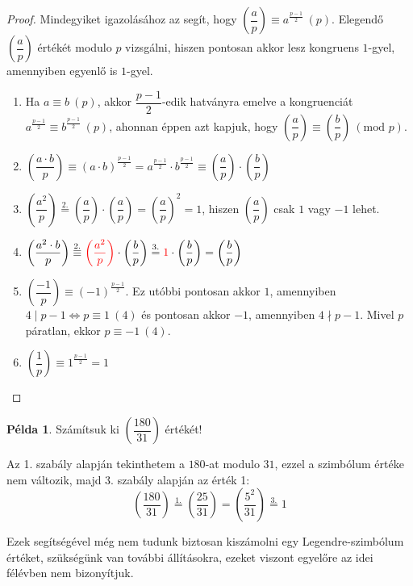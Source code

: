 \documentclass[12pt]{book}
\theoremstyle{plain} %
\theoremstyle{definition} %
\newtheorem{pl}{Példa}[section]
\theoremstyle{remark}
\numberwithin{equation}{section}  %
\begin{document}
	\begin{proof}
		Mindegyiket igazolásához az segít, hogy $\left(\dfrac{a}{p}\right) \equiv a^{\frac{p-1}{2}}\ (p)$. Elegendő $\left(\dfrac{a}{p}\right)$ értékét modulo $p$ vizsgálni, hiszen pontosan akkor lesz kongruens $1$-gyel, amennyiben egyenlő is $1$-gyel.
		\begin{enumerate}
			\item{Ha $a\equiv b\ (p)$, akkor $\dfrac{p-1}{2}$-edik hatványra emelve a kongruenciát $a^{\frac{p-1}{2}} \equiv b^{\frac{p-1}{2}}\ (p)$, ahonnan éppen azt kapjuk, hogy $\left(\dfrac{a}{p}\right) \equiv \left(\dfrac{b}{p}\right)\ (\text{mod } p)$.}
			\item{$\left(\dfrac{a\cdot b}{p}\right) \equiv (a\cdot b)^{\frac{p-1}{2}} = a^{\frac{p-1}{2}} \cdot b^{\frac{p-1}{2}} \equiv \left(\dfrac{a}{p}\right) \cdot \left(\dfrac{b}{p}\right)$}
			\item{$\left(\dfrac{a^2}{p}\right) \stackrel{2.}{=} \left(\dfrac{a}{p}\right)\cdot \left(\dfrac{a}{p}\right) = \left(\dfrac{a}{p}\right)^2 = 1 $, hiszen $\left(\dfrac{a}{p}\right)$ csak $1$ vagy $-1$ lehet.}
			\item{$\left(\dfrac{a^2\cdot b}{p}\right) \stackrel{2.}{\equiv} \color{red} \left(\dfrac{a^2}{p}\right) \color{black} \cdot \left(\dfrac{b}{p}\right) \stackrel{3.}{=} \color{red}1\color{black} \cdot \left(\dfrac{b}{p}\right) = \left(\dfrac{b}{p}\right)$}
			\item{$\left(\dfrac{-1}{p}\right) \equiv (-1)^{\frac{p-1}{2}}$. Ez utóbbi pontosan akkor $1$, amennyiben $4\mid p-1 \Leftrightarrow p \equiv 1\ (4)$ és pontosan akkor $-1$, amennyiben $4\nmid p-1$. Mivel $p$ páratlan, ekkor $p\equiv -1\ (4)$.}
			\item{$\left(\dfrac{1}{p}\right) \equiv 1^{\frac{p-1}{2}} = 1$}
		\end{enumerate}
	\end{proof}

	\begin{pl}
		Számítsuk ki $\left(\dfrac{180}{31}\right)$ értékét!
		
		Az 1. szabály alapján tekinthetem a $180$-at modulo $31$, ezzel a szimbólum értéke nem változik, majd 3. szabály alapján az érték 1:
		\[ \left(\dfrac{180}{31}\right) \stackrel{1.}{=} \left(\dfrac{25}{31}\right) = \left(\dfrac{5^2}{31}\right) \stackrel{3.}{=} 1 \]
	\end{pl}

	Ezek segítségével még nem tudunk biztosan kiszámolni egy Legendre-szimbólum értéket, szükségünk van további állításokra, ezeket viszont egyelőre az idei félévben nem bizonyítjuk.
	
\end{document}
